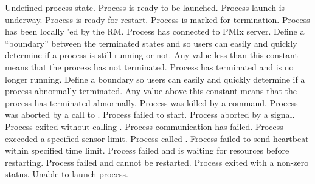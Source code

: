 \begin{constantdesc}
%
Undefined process state.
%
Process is ready to be launched.
%
Process launch is underway.
%
Process is ready for restart.
%
Process is marked for termination.
%
Process has been locally 'ed by the \ac{RM}.
%
Process has connected to PMIx server.
%
Define a ``boundary'' between the terminated states and  so users can easily and quickly determine if a process is still running or not.
Any value less than this constant means that the process has not terminated.
%
Process has terminated and is no longer running.
%
Define a boundary so users can easily and quickly determine if a process abnormally terminated.
Any value above this constant means that the process has terminated abnormally.
%
Process was killed by a command.
%
Process was aborted by a call to .
%
Process failed to start.
%
Process aborted by a signal.
%
Process exited without calling .
%
Process communication has failed.
%
Process exceeded a specified sensor limit.
%
Process called .
%
Frocess failed to send heartbeat within specified time limit.
%
Process failed and is waiting for resources before restarting.
%
Process failed and cannot be restarted.
%
Process exited with a non-zero status.
%
Unable to launch process.
%
\end{constantdesc}


